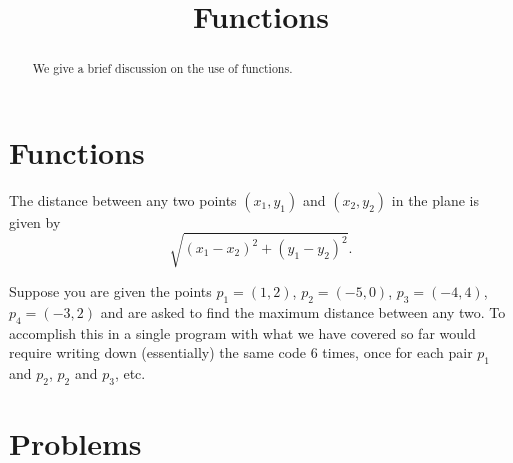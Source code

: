 \documentclass{ximera}
\title{Functions}
\begin{document}
  
\begin{abstract}  
We give a brief discussion on the use of functions.
\end{abstract}  
\maketitle

\section{Functions}

The distance between any two points $(x_1,y_1)$ and $(x_2,y_2)$ in the plane is given by $$\sqrt{(x_1-x_2)^2+(y_1-y_2)^2}.$$

Suppose you are given the points $p_1=(1,2)$, $p_2=(-5,0)$, $p_3=(-4,4)$, $p_4=(-3,2)$ and are asked to find the maximum distance between any two. To accomplish this in a single program with what we have covered so far would require writing down (essentially) the same code 6 times, once for each pair $p_1$ and $p_2$, $p_2$ and $p_3$, etc. 

\section{Problems}

\begin{question}
\end{question}

\begin{question}
\end{question}
\end{document}
